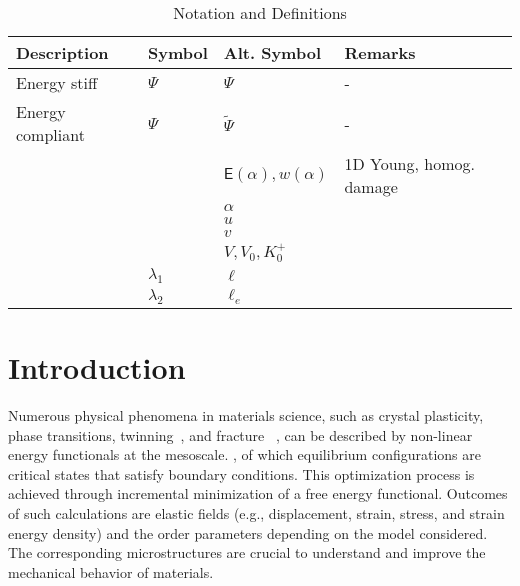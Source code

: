 



\begin{table}[h!]
    \centering
    \begin{tabular}{  m{3.5cm}  m{3cm}  m{2.5cm}  m{6cm}  }
      \hline
      \textbf{Description} & \textbf{Symbol} & \textbf{Alt. Symbol} & \textbf{Remarks} \\
      \hline
      Energy stiff     & $\Psi$ & $\Psi$ & - \\
      Energy compliant & $\Psi$ & $\widetilde \Psi$ & - \\
      & & $\mathsf E(\alpha), w(\alpha)$ & 1D Young, homog. damage\\
      & & $\alpha$ & \\
      & & $u$ & \\
      & & $v$ & \\
      & & $V, V_0, K^+_0$ & \\
      & $\lambda_1$ & $\ell$ & \\
      & $\lambda_2$ & $\ell_e$ & \\
    \end{tabular}
    \caption{Notation and Definitions}
\label{table:notation}
\end{table}

\section{Introduction}
Numerous physical phenomena in materials science, such as crystal plasticity, phase transitions, twinning~\cite{Clayton2011-xq}, and fracture ~\cite{Baldelli2014-ho,Baldelli2021-gc}, can be described by non-linear energy functionals at the mesoscale. , of which equilibrium configurations are critical states that satisfy boundary conditions. This optimization process is achieved through incremental minimization of a free energy functional. Outcomes of such calculations are elastic fields
(e.g., displacement, strain, stress, and strain energy density) and the order parameters depending on the model considered. The corresponding microstructures are crucial to understand and improve the mechanical behavior of materials.

